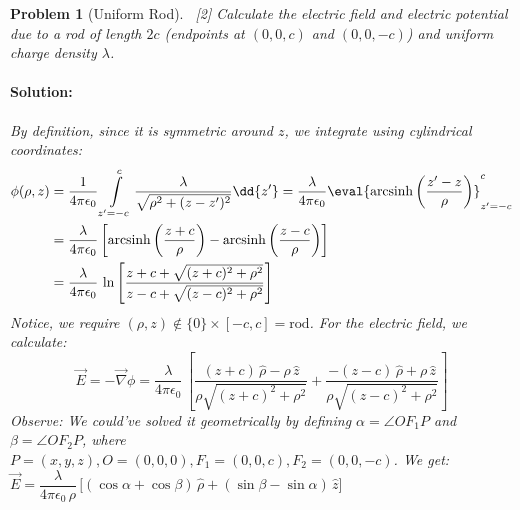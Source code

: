 \documentclass[12pt]{article}
\renewcommand{\grad}{\vec{\nabla}}
\DeclareMathOperator{\arcsinh}{arcsinh}
\newcommand*{\vE}{\vec{E}}
\newcommand*{\ee}{\epsilon_0}
\newtheorem{problem}[theorem]{Problem}
\newenvironment{solution}{\paragraph{Solution:}}{\hfill}
\begin{document}
\begin{problem}[Uniform Rod]
  $\,$
  [2]
  \noindent Calculate the electric field and electric potential due to a rod of length $2c$ (endpoints at $(0,0,c)$ and $(0,0,-c)$) and uniform charge density $\lambda$.
  \begin{solution}
    By definition, since it is symmetric around $z$, we integrate using cylindrical coordinates:
    \begin{align*}
      \phi(\rho,z)&=\frac{1}{4\pi\ee}\int\limits_{z'=-c}^c\frac{\lambda}{\sqrt{\rho^2+(z-z')^2}}\dd{z'}=\frac{\lambda}{4\pi\ee}\eval{\arcsinh\left(\frac{z'-z}{\rho}\right)}_{z'=-c}^c\\
      &=\frac{\lambda}{4\pi\ee}\left[\arcsinh\left(\frac{z+c}{\rho}\right)-\arcsinh\left(\frac{z-c}{\rho}\right)\right]\\
      &=\frac{\lambda}{4\pi\ee}\,\ln\left[\frac{z+c+\sqrt{(z+c)^2+\rho^2}}{z-c+\sqrt{(z-c)^2+\rho^2}}\right]
    \end{align*}
    Notice, we require $(\rho,z)\notin\{0\}\times[-c,c]=\text{rod}$. For the electric field, we calculate:
    $$\vE=-\grad\phi=\frac{\lambda}{4\pi\ee}\,\left[\frac{(z+c)\,\hat{\rho}-\rho\,\hat{z}}{\rho\sqrt{(z+c)^2+\rho^2}}+\frac{-(z-c)\,\hat{\rho}+\rho\,\hat{z}}{\rho\sqrt{(z-c)^2+\rho^2}}\right]$$
    \textit{Observe:} We could've solved it geometrically by defining $\alpha=\angle OF_1P$ and $\beta=\angle OF_2P$, where $P=(x,y,z),O=(0,0,0),F_1=(0,0,c),F_2=(0,0,-c)$. We get: $\vE=\dfrac{\lambda}{4\pi\ee\,\rho}\,\Big[(\cos{\alpha}+\cos{\beta})\,\hat{\rho}+(\sin{\beta}-\sin{\alpha})\,\hat{z}\Big]$
  \end{solution}
\end{problem}
\end{document}
